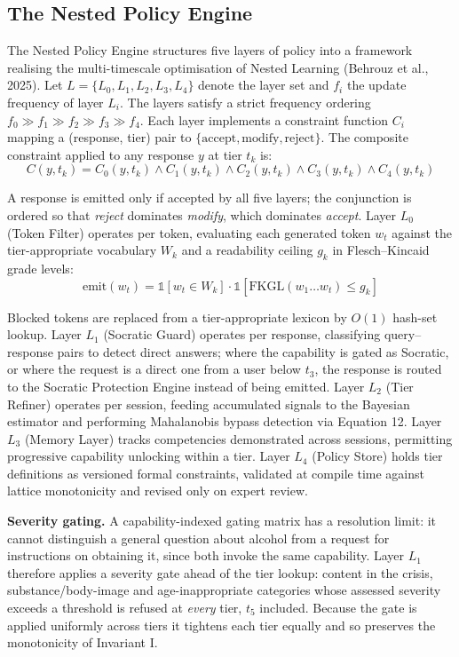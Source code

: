 \documentclass[fleqn,10pt]{wlscirep}
\newcommand{\mathbbm}[1]{\ensuremath{\mathbb{#1}}}
\begin{document}
\subsection*{The Nested Policy Engine}

The Nested Policy Engine structures five layers of policy into a framework realising the multi-timescale optimisation of Nested Learning (Behrouz et al., 2025)\cite{Behrouz2025}. Let $L = \{L_0, L_1, L_2, L_3, L_4\}$ denote the layer set and $f_i$ the update frequency of layer $L_i$. The layers satisfy a strict frequency ordering $f_0 \gg f_1 \gg f_2 \gg f_3 \gg f_4$. Each layer implements a constraint function $C_i$ mapping a (response, tier) pair to $\{\text{accept}, \text{modify}, \text{reject}\}$. The composite constraint applied to any response $y$ at tier $t_k$ is:
\begin{equation}
C(y, t_k) = C_0(y, t_k) \wedge C_1(y, t_k) \wedge C_2(y, t_k) \wedge C_3(y, t_k) \wedge C_4(y, t_k)
\end{equation}

A response is emitted only if accepted by all five layers; the conjunction is ordered so that \emph{reject} dominates \emph{modify}, which dominates \emph{accept}. Layer $L_0$ (Token Filter) operates per token, evaluating each generated token $w_t$ against the tier-appropriate vocabulary $W_k$ and a readability ceiling $g_k$ in Flesch--Kincaid grade levels:
\begin{equation}
\text{emit}(w_t) = \mathbbm{1}[w_t \in W_k] \cdot \mathbbm{1}[\text{FKGL}(w_1 \ldots w_t) \leq g_k]
\end{equation}

Blocked tokens are replaced from a tier-appropriate lexicon by $O(1)$ hash-set lookup. Layer $L_1$ (Socratic Guard) operates per response, classifying query--response pairs to detect direct answers; where the capability is gated as Socratic, or where the request is a direct one from a user below $t_3$, the response is routed to the Socratic Protection Engine instead of being emitted. Layer $L_2$ (Tier Refiner) operates per session, feeding accumulated signals to the Bayesian estimator and performing Mahalanobis bypass detection via Equation 12. Layer $L_3$ (Memory Layer) tracks competencies demonstrated across sessions, permitting progressive capability unlocking within a tier. Layer $L_4$ (Policy Store) holds tier definitions as versioned formal constraints, validated at compile time against lattice monotonicity and revised only on expert review.

\textbf{Severity gating.} A capability-indexed gating matrix has a resolution limit: it cannot distinguish a general question about alcohol from a request for instructions on obtaining it, since both invoke the same capability. Layer $L_1$ therefore applies a severity gate ahead of the tier lookup: content in the crisis, substance/body-image and age-inappropriate categories whose assessed severity exceeds a threshold is refused at \emph{every} tier, $t_5$ included. Because the gate is applied uniformly across tiers it tightens each tier equally and so preserves the monotonicity of Invariant I.
\end{document}
